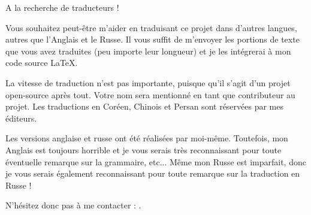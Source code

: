 \vspace*{\fill}

\Huge A la recherche de traducteurs !

\normalsize

\bigskip
\bigskip
\bigskip

Vous souhaitez peut-être m'aider en traduisant ce projet dans d'autres langues, autres que l'Anglais et le Russe.
Il vous suffit de m'envoyer les portions de texte que vous avez traduites (peu importe leur longueur) et je les intégrerai à mon code source LaTeX.

\iffalse
Pour ceux qui n'ont pas peur de TeX : \href{https://github.com/dennis714/RE-for-beginners/blob/master/Translation.md}{lire ici}.
Pour ceux qui en ont peur, vous pouvez également tout simplement ouvrir le fichier PDF dans OpenOffice et progressivement traduire chaque phrase.
Je ferai un copier/coller de votre travail vers mon code source LaTeX.
Il existe encore un meilleur moyen : d'après mon expérience, vous pouvez gagner en motivation en traduisant de petits morceaux de mon livre et en les postant sur votre blog (ou vos blogs).
Je peux publier ici les URLs vers vos publications et également sur mon Twitter (\href{http://twitter.com/yurichev}{@yurichev}).
\fi

La vitesse de traduction n'est pas importante, puisque qu'il s'agit d'un projet open-source après tout.
Votre nom sera mentionné en tant que contributeur au projet.
Les traductions en Coréen, Chinois et Persan sont réservées par mes éditeurs.

Les versions anglaise et russe ont été réalisées par moi-même.
Toutefois, mon Anglais est toujours horrible et je vous serais très reconnaissant pour toute éventuelle remarque sur la grammaire, etc...
Même mon Russe est imparfait, donc je vous serais également reconnaissant pour toute remarque sur la traduction en Russe !%

N'hésitez donc pas à me contacter : \GTT{\EMAIL}.

\vspace*{\fill}
\vfill
